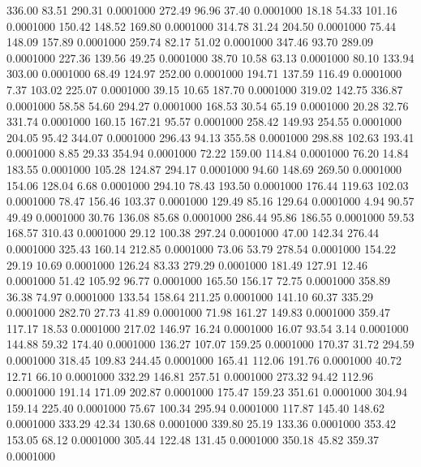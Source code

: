  336.00   83.51  290.31   0.0001000
 272.49   96.96   37.40   0.0001000
  18.18   54.33  101.16   0.0001000
 150.42  148.52  169.80   0.0001000
 314.78   31.24  204.50   0.0001000
  75.44  148.09  157.89   0.0001000
 259.74   82.17   51.02   0.0001000
 347.46   93.70  289.09   0.0001000
 227.36  139.56   49.25   0.0001000
  38.70   10.58   63.13   0.0001000
  80.10  133.94  303.00   0.0001000
  68.49  124.97  252.00   0.0001000
 194.71  137.59  116.49   0.0001000
   7.37  103.02  225.07   0.0001000
  39.15   10.65  187.70   0.0001000
 319.02  142.75  336.87   0.0001000
  58.58   54.60  294.27   0.0001000
 168.53   30.54   65.19   0.0001000
  20.28   32.76  331.74   0.0001000
 160.15  167.21   95.57   0.0001000
 258.42  149.93  254.55   0.0001000
 204.05   95.42  344.07   0.0001000
 296.43   94.13  355.58   0.0001000
 298.88  102.63  193.41   0.0001000
   8.85   29.33  354.94   0.0001000
  72.22  159.00  114.84   0.0001000
  76.20   14.84  183.55   0.0001000
 105.28  124.87  294.17   0.0001000
  94.60  148.69  269.50   0.0001000
 154.06  128.04    6.68   0.0001000
 294.10   78.43  193.50   0.0001000
 176.44  119.63  102.03   0.0001000
  78.47  156.46  103.37   0.0001000
 129.49   85.16  129.64   0.0001000
   4.94   90.57   49.49   0.0001000
  30.76  136.08   85.68   0.0001000
 286.44   95.86  186.55   0.0001000
  59.53  168.57  310.43   0.0001000
  29.12  100.38  297.24   0.0001000
  47.00  142.34  276.44   0.0001000
 325.43  160.14  212.85   0.0001000
  73.06   53.79  278.54   0.0001000
 154.22   29.19   10.69   0.0001000
 126.24   83.33  279.29   0.0001000
 181.49  127.91   12.46   0.0001000
  51.42  105.92   96.77   0.0001000
 165.50  156.17   72.75   0.0001000
 358.89   36.38   74.97   0.0001000
 133.54  158.64  211.25   0.0001000
 141.10   60.37  335.29   0.0001000
 282.70   27.73   41.89   0.0001000
  71.98  161.27  149.83   0.0001000
 359.47  117.17   18.53   0.0001000
 217.02  146.97   16.24   0.0001000
  16.07   93.54    3.14   0.0001000
 144.88   59.32  174.40   0.0001000
 136.27  107.07  159.25   0.0001000
 170.37   31.72  294.59   0.0001000
 318.45  109.83  244.45   0.0001000
 165.41  112.06  191.76   0.0001000
  40.72   12.71   66.10   0.0001000
 332.29  146.81  257.51   0.0001000
 273.32   94.42  112.96   0.0001000
 191.14  171.09  202.87   0.0001000
 175.47  159.23  351.61   0.0001000
 304.94  159.14  225.40   0.0001000
  75.67  100.34  295.94   0.0001000
 117.87  145.40  148.62   0.0001000
 333.29   42.34  130.68   0.0001000
 339.80   25.19  133.36   0.0001000
 353.42  153.05   68.12   0.0001000
 305.44  122.48  131.45   0.0001000
 350.18   45.82  359.37   0.0001000
